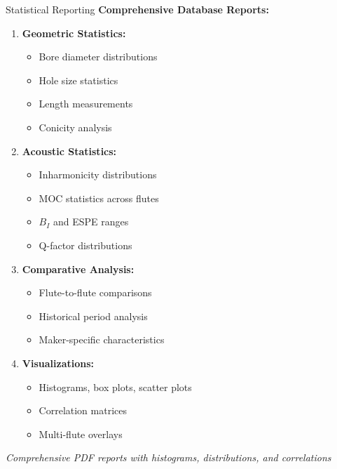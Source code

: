\documentclass[aspectratio=169,10pt]{beamer}
\begin{document}
\begin{frame}{Statistical Reporting}
\textbf{Comprehensive Database Reports:}

\begin{enumerate}
    \item \textbf{Geometric Statistics:}
    \begin{itemize}
        \item Bore diameter distributions
        \item Hole size statistics
        \item Length measurements
        \item Conicity analysis
    \end{itemize}
    
    \item \textbf{Acoustic Statistics:}
    \begin{itemize}
        \item Inharmonicity distributions
        \item MOC statistics across flutes
        \item $B_I$ and ESPE ranges
        \item Q-factor distributions
    \end{itemize}
    
    \item \textbf{Comparative Analysis:}
    \begin{itemize}
        \item Flute-to-flute comparisons
        \item Historical period analysis
        \item Maker-specific characteristics
    \end{itemize}
    
    \item \textbf{Visualizations:}
    \begin{itemize}
        \item Histograms, box plots, scatter plots
        \item Correlation matrices
        \item Multi-flute overlays
    \end{itemize}
\end{enumerate}

\vspace{0.3cm}
\textit{Comprehensive PDF reports with histograms, distributions, and correlations}
\end{frame}

\end{document}
